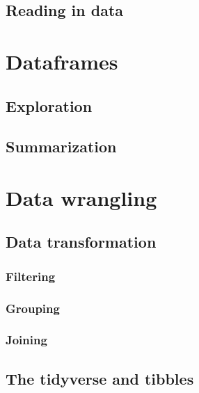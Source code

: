 \documentclass[
]{book}
\begin{document}
\hypertarget{reading-in-data}{%
\section{Reading in data}\label{reading-in-data}}

\hypertarget{dataframes}{%
\chapter{Dataframes}\label{dataframes}}

\hypertarget{exploration}{%
\section{Exploration}\label{exploration}}

\hypertarget{summarization}{%
\section{Summarization}\label{summarization}}

\hypertarget{data-wrangling}{%
\chapter{Data wrangling}\label{data-wrangling}}

\hypertarget{data-transformation}{%
\section{Data transformation}\label{data-transformation}}

\hypertarget{filtering}{%
\subsection{Filtering}\label{filtering}}

\hypertarget{grouping}{%
\subsection{Grouping}\label{grouping}}

\hypertarget{joining}{%
\subsection{Joining}\label{joining}}

\hypertarget{the-tidyverse-and-tibbles}{%
\section{The tidyverse and tibbles}\label{the-tidyverse-and-tibbles}}
\end{document}
